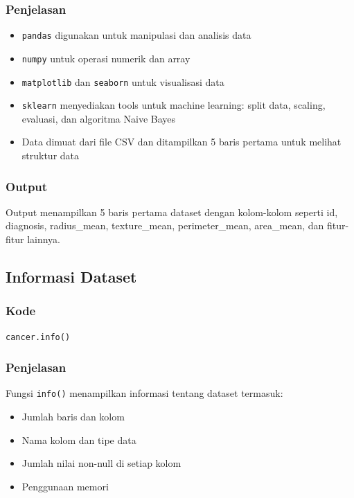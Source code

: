 \documentclass[12pt,a4paper]{article}
\begin{document}
\subsubsection{Penjelasan}
\begin{itemize}
    \item \texttt{pandas} digunakan untuk manipulasi dan analisis data
    \item \texttt{numpy} untuk operasi numerik dan array
    \item \texttt{matplotlib} dan \texttt{seaborn} untuk visualisasi data
    \item \texttt{sklearn} menyediakan tools untuk machine learning: split data, scaling, evaluasi, dan algoritma Naive Bayes
    \item Data dimuat dari file CSV dan ditampilkan 5 baris pertama untuk melihat struktur data
\end{itemize}

\subsubsection{Output}
Output menampilkan 5 baris pertama dataset dengan kolom-kolom seperti id, diagnosis, radius\_mean, texture\_mean, perimeter\_mean, area\_mean, dan fitur-fitur lainnya.

\subsection{Informasi Dataset}

\subsubsection{Kode}
\begin{lstlisting}[style=pythonstyle]
cancer.info()
\end{lstlisting}

\subsubsection{Penjelasan}
Fungsi \texttt{info()} menampilkan informasi tentang dataset termasuk:
\begin{itemize}
    \item Jumlah baris dan kolom
    \item Nama kolom dan tipe data
    \item Jumlah nilai non-null di setiap kolom
    \item Penggunaan memori
\end{itemize}
\end{document}
